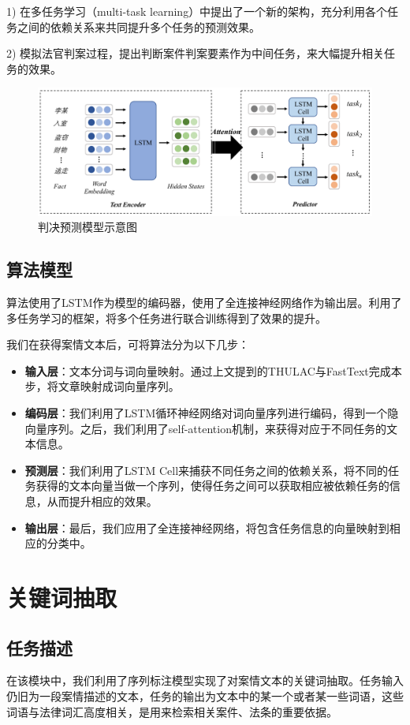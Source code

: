 1)	在多任务学习（multi-task learning）中提出了一个新的架构，充分利用各个任务之间的依赖关系来共同提升多个任务的预测效果。

2)	模拟法官判案过程，提出判断案件判案要素作为中间任务，来大幅提升相关任务的效果。

\begin{figure}[ht]
    \centering
    \includegraphics[width=\linewidth]{figures/model1}
    \caption{判决预测模型示意图}
    \label{fig:model1}
\end{figure}

\subsection{算法模型}
算法使用了LSTM作为模型的编码器，使用了全连接神经网络作为输出层。利用了多任务学习的框架，将多个任务进行联合训练得到了效果的提升。

我们在获得案情文本后，可将算法分为以下几步：
\begin{itemize}
	\item \textbf{输入层}：文本分词与词向量映射。通过上文提到的THULAC与FastText完成本步，将文章映射成词向量序列。
	\item \textbf{编码层}：我们利用了LSTM循环神经网络对词向量序列进行编码，得到一个隐向量序列。之后，我们利用了self-attention机制，来获得对应于不同任务的文本信息。
	\item \textbf{预测层}：我们利用了LSTM Cell来捕获不同任务之间的依赖关系，将不同的任务获得的文本向量当做一个序列，使得任务之间可以获取相应被依赖任务的信息，从而提升相应的效果。
	\item \textbf{输出层}：最后，我们应用了全连接神经网络，将包含任务信息的向量映射到相应的分类中。
\end{itemize}


\section{关键词抽取}
\subsection{任务描述}
在该模块中，我们利用了序列标注模型实现了对案情文本的关键词抽取。任务输入仍旧为一段案情描述的文本，任务的输出为文本中的某一个或者某一些词语，这些词语与法律词汇高度相关，是用来检索相关案件、法条的重要依据。

